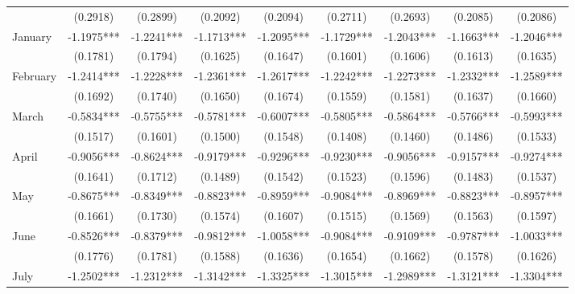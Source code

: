\begin{table}[htbp]
\begin{tabular}{l*{8}{c}}
                    &    (0.2918)   &    (0.2899)   &    (0.2092)   &    (0.2094)   &    (0.2711)   &    (0.2693)   &    (0.2085)   &    (0.2086)   \\
January             &     -1.1975***&     -1.2241***&     -1.1713***&     -1.2095***&     -1.1729***&     -1.2043***&     -1.1663***&     -1.2046***\\
                    &    (0.1781)   &    (0.1794)   &    (0.1625)   &    (0.1647)   &    (0.1601)   &    (0.1606)   &    (0.1613)   &    (0.1635)   \\
February            &     -1.2414***&     -1.2228***&     -1.2361***&     -1.2617***&     -1.2242***&     -1.2273***&     -1.2332***&     -1.2589***\\
                    &    (0.1692)   &    (0.1740)   &    (0.1650)   &    (0.1674)   &    (0.1559)   &    (0.1581)   &    (0.1637)   &    (0.1660)   \\
March               &     -0.5834***&     -0.5755***&     -0.5781***&     -0.6007***&     -0.5805***&     -0.5864***&     -0.5766***&     -0.5993***\\
                    &    (0.1517)   &    (0.1601)   &    (0.1500)   &    (0.1548)   &    (0.1408)   &    (0.1460)   &    (0.1486)   &    (0.1533)   \\
April               &     -0.9056***&     -0.8624***&     -0.9179***&     -0.9296***&     -0.9230***&     -0.9056***&     -0.9157***&     -0.9274***\\
                    &    (0.1641)   &    (0.1712)   &    (0.1489)   &    (0.1542)   &    (0.1523)   &    (0.1596)   &    (0.1483)   &    (0.1537)   \\
May                 &     -0.8675***&     -0.8349***&     -0.8823***&     -0.8959***&     -0.9084***&     -0.8969***&     -0.8823***&     -0.8957***\\
                    &    (0.1661)   &    (0.1730)   &    (0.1574)   &    (0.1607)   &    (0.1515)   &    (0.1569)   &    (0.1563)   &    (0.1597)   \\
June                &     -0.8526***&     -0.8379***&     -0.9812***&     -1.0058***&     -0.9084***&     -0.9109***&     -0.9787***&     -1.0033***\\
                    &    (0.1776)   &    (0.1781)   &    (0.1588)   &    (0.1636)   &    (0.1654)   &    (0.1662)   &    (0.1578)   &    (0.1626)   \\
July                &     -1.2502***&     -1.2312***&     -1.3142***&     -1.3325***&     -1.3015***&     -1.2989***&     -1.3121***&     -1.3304***\\

\end{tabular}
\end{table}
